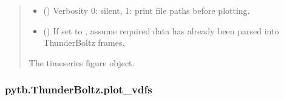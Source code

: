 \documentclass[letterpaper,10pt,english,openany,oneside]{sphinxmanual}
\begin{document}
\begin{fulllineitems}
\begin{fulllineitems}
\begin{quote}
\begin{description}
\begin{itemize}
\item {} 
\sphinxAtStartPar
{} () \textendash{} Verbosity \textendash{} 0: silent, 1: print file paths before
plotting.

\item {} 
\sphinxAtStartPar
{} () \textendash{} If set to , assume required data has
already been parsed into ThunderBoltz frames.

\end{itemize}

\sphinxAtStartPar
The timeseries figure object.

\sphinxAtStartPar
{}

\end{description}\end{quote}

\end{fulllineitems}


\sphinxstepscope


\subsubsection{pytb.ThunderBoltz.plot\_vdfs}
\label{\detokenize{api/pytb.ThunderBoltz.plot_vdfs:pytb-thunderboltz-plot-vdfs}}\label{\detokenize{api/pytb.ThunderBoltz.plot_vdfs::doc}}


\end{fulllineitems}
\end{document}

